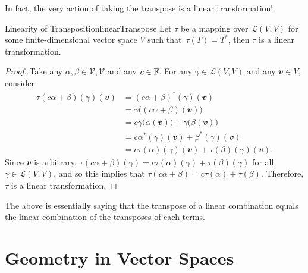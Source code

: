 \documentclass[math]{amznotes}
\theoremstyle{remark}
\begin{document}
In fact, the very action of taking the transpose is a linear transformation!
\begin{probox}{Linearity of Transposition}{linearTranspose}
    Let $\tau$ be a mapping over $\mathcal{L}(V, V)$ for some finite-dimensional vector space $V$ such that~$\tau(T) = T^*$, then $\tau$ is a linear transformation.
    \tcblower
    \begin{proof}
        Take any $\alpha, \beta \in \mathcal{V, V}$ and any $c \in \mathbb{F}$. For any $\gamma \in \mathcal{L}(V, V)$ and any $\mathbfit{v} \in V$, consider 
        \begin{align*}
            \tau(c\alpha + \beta)(\gamma)(\mathbfit{v}) & = \left(c\alpha + \beta\right)^*(\gamma)(\mathbfit{v}) \\
            & = \gamma\bigl((c\alpha + \beta)(\mathbfit{v})\bigr) \\
            & = c\gamma\bigl(\alpha(\mathbfit{v})\bigr) + \gamma\bigl(\beta(\mathbfit{v})\bigr) \\
            & = c\alpha^*(\gamma)(\mathbfit{v}) + \beta^*(\gamma)(\mathbfit{v}) \\
            & = c\tau(\alpha)(\gamma)(\mathbfit{v}) + \tau(\beta)(\gamma)(\mathbfit{v}).
        \end{align*}
        Since $\mathbfit{v}$ is arbitrary, $\tau(c\alpha + \beta)(\gamma) = c\tau(\alpha)(\gamma) + \tau(\beta)(\gamma)$ for all $\gamma \in \mathcal{L}(V, V)$, and so this implies that $\tau(c\alpha + \beta) = c\tau(\alpha) + \tau(\beta)$. Therefore, $\tau$ is a linear transformation.
    \end{proof}
\end{probox}
The above is essentially saying that the transpose of a linear combination equals the linear combination of the transposes of each terms.
\chapter{Geometry in Vector Spaces}
\end{document}
